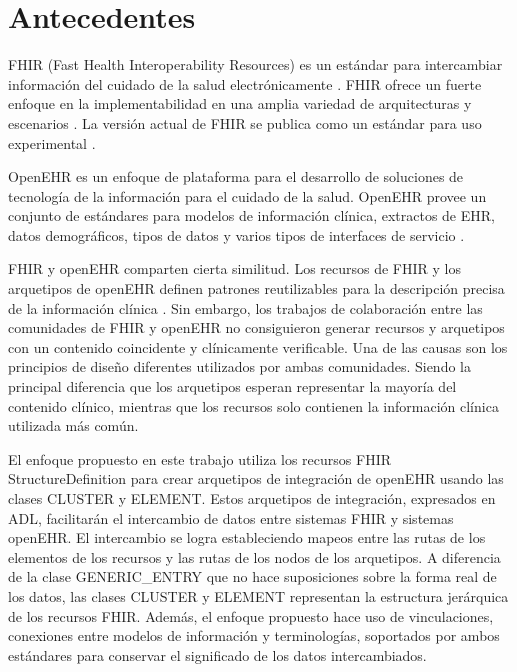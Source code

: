 \section{Antecedentes}

FHIR (Fast Health Interoperability Resources) es un estándar para intercambiar información del cuidado de la salud electrónicamente \cite{FHIRClinician}. FHIR ofrece un fuerte enfoque en la implementabilidad en una amplia variedad de arquitecturas y escenarios \cite{FHIRExecutive}. La versión actual de FHIR se publica como un estándar para uso experimental \cite{FHIR}.

OpenEHR es un enfoque de plataforma para el desarrollo de soluciones de tecnología de la información para el cuidado de la salud. OpenEHR provee un conjunto de estándares para modelos de información clínica, extractos de EHR, datos demográficos, tipos de datos y varios tipos de interfaces de servicio \cite{openEHRWhitePaper}.







FHIR y openEHR comparten cierta similitud. Los recursos de FHIR y los arquetipos de openEHR definen patrones reutilizables para la descripción precisa de la información clínica \cite{Bosca15}. Sin embargo, los trabajos de colaboración entre las comunidades de FHIR y openEHR \cite{Collaboration} no consiguieron generar recursos y arquetipos con un contenido coincidente y clínicamente verificable. Una de las causas son los principios de diseño diferentes utilizados por ambas comunidades. Siendo la principal diferencia que los arquetipos esperan representar la mayoría del contenido clínico, mientras que los recursos solo contienen la información clínica utilizada más común.

El enfoque propuesto en este trabajo utiliza los recursos FHIR StructureDefinition para crear arquetipos de integración de openEHR usando las clases CLUSTER y ELEMENT. Estos arquetipos de integración, expresados en ADL, facilitarán el intercambio de datos entre sistemas FHIR y sistemas openEHR. El intercambio se logra estableciendo mapeos entre las rutas de los elementos de los recursos y las rutas de los nodos de los arquetipos. A diferencia de la clase GENERIC\_ENTRY que no hace suposiciones sobre la forma real de los datos, las clases CLUSTER y ELEMENT representan la estructura jerárquica de los recursos FHIR. Además, el enfoque propuesto hace uso de vinculaciones, conexiones entre modelos de información y terminologías, soportados por ambos estándares para conservar el significado de los datos intercambiados.
